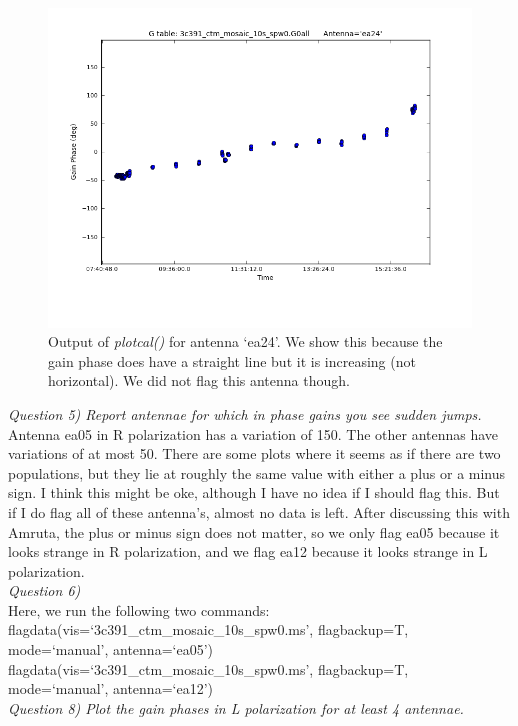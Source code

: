 \documentclass[12pt, a4paper]{article}
\begin{document}
\begin{figure}[h!]
    \centering
    \includegraphics[scale=0.5]{../Imaging/plots/phase_calibration_part4c_question5_ea24.png}
    \caption{Output of \emph{plotcal()} for antenna `ea24'. We show this because the gain phase does have a straight line but it is increasing (not horizontal). We did not flag this antenna though. \label{fig:part4subC2-4}}
\end{figure}
\newpage


\noindent \textit{Question 5) Report antennae for which in phase gains you see sudden jumps.} \\
Antenna ea05 in R polarization has a variation of 150. The other antennas have variations of at most 50. There are some plots where it seems as if there are two populations, but they lie at roughly the same value with either a plus or a minus sign. I think this might be oke, although I have no idea if I should flag this. But if I do flag all of these antenna's, almost no data is left. After discussing this with Amruta, the plus or minus sign does not matter, so we only flag ea05 because it looks strange in R polarization, and we flag ea12 because it looks strange in L polarization. \\

\noindent \textit{Question 6) } \\
\noindent Here, we run the following two commands: \\
{\tiny flagdata(vis=`3c391\_ctm\_mosaic\_10s\_spw0.ms', flagbackup=T, mode=`manual', antenna=`ea05') \\
\noindent flagdata(vis=`3c391\_ctm\_mosaic\_10s\_spw0.ms', flagbackup=T, mode=`manual', antenna=`ea12') \\ }
% 
\noindent \textit{Question 8) Plot the gain phases in L polarization for at least 4 antennae.} \\
\newpage 
\end{document}
